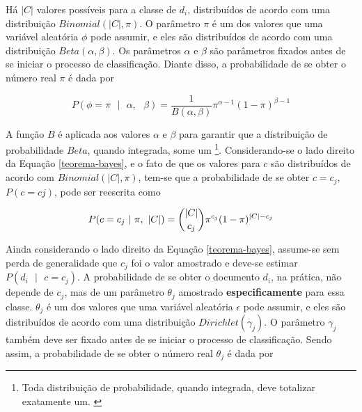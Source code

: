 Há \ensuremath{|C|} valores possíveis para a classe de \ensuremath{d_i}, distribuídos de acordo com uma distribuição \ensuremath{Binomial(|C|, \pi)}. O parâmetro \ensuremath{\pi} é um dos valores que uma variável aleatória \ensuremath{\phi} pode assumir, e eles são distribuídos de acordo com uma distribuição \ensuremath{Beta(\alpha, \beta)}. Os parâmetros \ensuremath{\alpha} e \ensuremath{\beta} são parâmetros fixados antes de se iniciar o processo de classificação. Diante disso, a probabilidade de se obter o número real \ensuremath{\pi} é dada por  \cite{resnik}

\begin{equation}
\label{beta}
\ensuremath{P(\phi = \pi\mbox{ }|\mbox{ } \alpha,\mbox{ }\beta) = \frac{1}{B(\alpha, \beta)}\pi^{\alpha - 1}(1 - \pi)^{\beta - 1}}
\end{equation}

A função \ensuremath{B} é aplicada aos valores \ensuremath{\alpha} e \ensuremath{\beta} para garantir que a distribuição de probabilidade \ensuremath{Beta}, quando integrada, some um \cite{stat-distribs}\footnote{Toda distribuição de probabilidade, quando integrada, deve totalizar exatamente um. \cite{stat-distribs}}. Considerando-se o lado direito da Equação \ref{teorema-bayes}, e o fato de que os valores para \ensuremath{c} são distribuídos de acordo com \ensuremath{Binomial(|C|, \pi)}, tem-se que a probabilidade de se obter \ensuremath{c = c_j}, \ensuremath{P(c = cj)}, pode ser reescrita como \cite{resnik}

\begin{equation}
\label{binomial}
\ensuremath{P(c = c_j\mbox{ } |\mbox{ } \pi,\mbox{ } |C|) =  \dbinom{|C|}{c_j}\pi^{c_j}(1 - \pi)^{|C| - c_j}}
\end{equation}


Ainda considerando o lado direito da Equação \ref{teorema-bayes}, assume-se sem perda de generalidade que \ensuremath{c_j} foi o valor amostrado e deve-se estimar \ensuremath{P(d_i\mbox{ } |\mbox{ } c = c_j)}. A probabilidade de se obter o documento \ensuremath{d_i}, na prática, não depende de \ensuremath{c_j}, mas de um parâmetro \ensuremath{\theta_j} amostrado \textbf{especificamente} para essa classe. \ensuremath{\theta_j} é um dos valores que uma variável aleatória \ensuremath{\epsilon} pode assumir, e eles são distribuídos de acordo com uma distribuição \ensuremath{Dirichlet(\gamma_j)}. O parâmetro \ensuremath{\gamma_j} também deve ser fixado antes de se iniciar o processo de classificação. Sendo assim, a probabilidade de se obter o número real \ensuremath{\theta_j} é dada por \cite{resnik}


